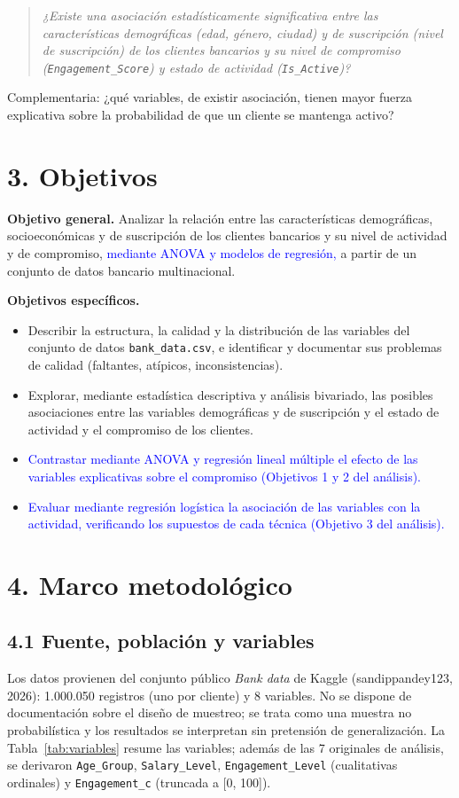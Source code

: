\documentclass[a4,11pt]{aleph-notas}
\newcommand{\nv}[1]{\textcolor{blue}{#1}}   %
\begin{document}
\begin{quote}
\emph{¿Existe una asociación estadísticamente significativa entre las características demográficas (edad, género, ciudad) y de suscripción (nivel de suscripción) de los clientes bancarios y su nivel de compromiso (\texttt{Engagement\_Score}) y estado de actividad (\texttt{Is\_Active})?}
\end{quote}

Complementaria: ¿qué variables, de existir asociación, tienen mayor fuerza explicativa sobre la probabilidad de que un cliente se mantenga activo?

\section*{3. Objetivos}
\textbf{Objetivo general.} Analizar la relación entre las características demográficas, socioeconómicas y de suscripción de los clientes bancarios y su nivel de actividad y de compromiso, \nv{mediante ANOVA y modelos de regresión,} a partir de un conjunto de datos bancario multinacional.

\textbf{Objetivos específicos.}
\begin{itemize}
    \item Describir la estructura, la calidad y la distribución de las variables del conjunto de datos \texttt{bank\_data.csv}, e identificar y documentar sus problemas de calidad (faltantes, atípicos, inconsistencias).
    \item Explorar, mediante estadística descriptiva y análisis bivariado, las posibles asociaciones entre las variables demográficas y de suscripción y el estado de actividad y el compromiso de los clientes.
    \item \nv{Contrastar mediante ANOVA y regresión lineal múltiple el efecto de las variables explicativas sobre el compromiso (Objetivos 1 y 2 del análisis).}
    \item \nv{Evaluar mediante regresión logística la asociación de las variables con la actividad, verificando los supuestos de cada técnica (Objetivo 3 del análisis).}
\end{itemize}

\section*{4. Marco metodológico}

\subsection*{4.1 Fuente, población y variables}
Los datos provienen del conjunto público \emph{Bank data} de Kaggle (sandippandey123, 2026): 1.000.050 registros (uno por cliente) y 8 variables. No se dispone de documentación sobre el diseño de muestreo; se trata como una muestra no probabilística y los resultados se interpretan sin pretensión de generalización. La Tabla~\ref{tab:variables} resume las variables; además de las 7 originales de análisis, se derivaron \texttt{Age\_Group}, \texttt{Salary\_Level}, \texttt{Engagement\_Level} (cualitativas ordinales) y \texttt{Engagement\_c} (truncada a [0, 100]).
\end{document}

